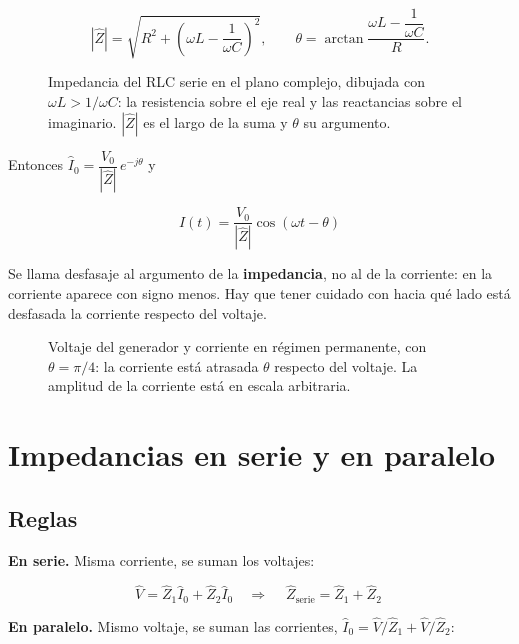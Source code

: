 \documentclass[12pt,a4paper]{article}
\begin{document}
\[
|\hat Z| = \sqrt{R^2 + \left(\omega L - \frac{1}{\omega C}\right)^2},
\qquad
\theta = \arctan\frac{\omega L - \dfrac{1}{\omega C}}{R}.
\]

\begin{figure}[H]
  \centering
  
  \caption{Impedancia del RLC serie en el plano complejo, dibujada con $\omega L > 1/\omega C$: la resistencia sobre el eje real y las reactancias sobre el imaginario. $|\hat Z|$ es el largo de la suma y $\theta$ su argumento.}
\end{figure}

Entonces $\hat I_0 = \dfrac{V_0}{|\hat Z|}\,e^{-j\theta}$ y

\begin{keybox}
\[
\boxed{\ I(t) = \frac{V_0}{|\hat Z|}\cos(\omega t - \theta)\ }
\]
\end{keybox}

\begin{notebox}[Convención]
Se llama desfasaje al argumento de la \textbf{impedancia}, no al de
la corriente: en la corriente aparece con signo menos. Hay que tener cuidado
con hacia qué lado está desfasada la corriente respecto del voltaje.
\end{notebox}

\begin{figure}[H]
  \centering
  
  \caption{Voltaje del generador y corriente en régimen permanente, con $\theta = \pi/4$: la corriente está atrasada $\theta$ respecto del voltaje. La amplitud de la corriente está en escala arbitraria.}
\end{figure}

\section{Impedancias en serie y en paralelo}

\subsection{Reglas}

\textbf{En serie.} Misma corriente, se suman los voltajes:

\[
\hat V = \hat Z_1\hat I_0 + \hat Z_2\hat I_0
\quad\Longrightarrow\quad
\boxed{\ {\hat Z}_{\text{serie}} = \hat Z_1 + \hat Z_2\ }
\]

\textbf{En paralelo.} Mismo voltaje, se suman las corrientes,
$\hat I_0 = \hat V/\hat Z_1 + \hat V/\hat Z_2$:
\end{document}
